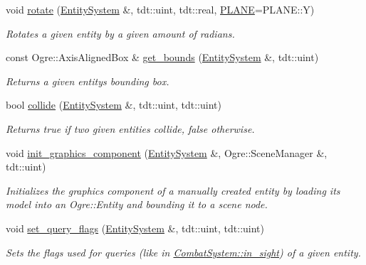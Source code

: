 \begin{DoxyCompactItemize}
void \hyperlink{namespace_graphics_helper_a8a440e080c158812f1360a0664366667}{rotate} (\hyperlink{class_entity_system}{Entity\+System} \&, tdt\+::uint, tdt\+::real, \hyperlink{namespace_graphics_helper_abb17d8dd557f79c9ea251cdd14bf0fd3}{P\+L\+A\+NE}=P\+L\+A\+N\+E\+::Y)
\begin{DoxyCompactList}\small\item\em Rotates a given entity by a given amount of radians. \end{DoxyCompactList}\item 
const Ogre\+::\+Axis\+Aligned\+Box \& \hyperlink{namespace_graphics_helper_aa01e3e2d49e1230f5bdcd3142565da25}{get\+\_\+bounds} (\hyperlink{class_entity_system}{Entity\+System} \&, tdt\+::uint)
\begin{DoxyCompactList}\small\item\em Returns a given entity\textquotesingle{}s bounding box. \end{DoxyCompactList}\item 
bool \hyperlink{namespace_graphics_helper_ae4166fe250dfa22b3d2f344f6e378873}{collide} (\hyperlink{class_entity_system}{Entity\+System} \&, tdt\+::uint, tdt\+::uint)
\begin{DoxyCompactList}\small\item\em Returns true if two given entities collide, false otherwise. \end{DoxyCompactList}\item 
void \hyperlink{namespace_graphics_helper_a6c909a4b3534a29ba75a2f242de14aaf}{init\+\_\+graphics\+\_\+component} (\hyperlink{class_entity_system}{Entity\+System} \&, Ogre\+::\+Scene\+Manager \&, tdt\+::uint)
\begin{DoxyCompactList}\small\item\em Initializes the graphics component of a manually created entity by loading it\textquotesingle{}s model into an Ogre\+::\+Entity and bounding it to a scene node. \end{DoxyCompactList}\item 
void \hyperlink{namespace_graphics_helper_aa641ddef043c2ee897aa4c04bfc54953}{set\+\_\+query\+\_\+flags} (\hyperlink{class_entity_system}{Entity\+System} \&, tdt\+::uint, tdt\+::uint)
\begin{DoxyCompactList}\small\item\em Sets the flags used for queries (like in \hyperlink{class_combat_system_a9e4c1c2747bd800a6766a59f633c7177}{Combat\+System\+::in\+\_\+sight}) of a given entity. \end{DoxyCompactList}\item 

\end{DoxyCompactItemize}
